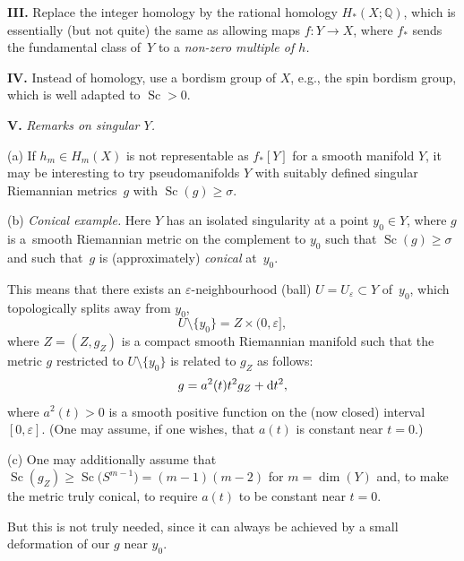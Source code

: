 \documentclass[10pt,a4paper]{amsart}
\numberwithin{equation}{section}
\begin{document}
\textbf{III.} Replace the integer homology by the rational homology $H_\ast(X;\mathbb Q)$, which is essentially (but not quite)
the same as allowing maps $f\colon Y\to X$, where
$f_\ast$ sends
 the fundamental class of~$Y$ to a {\it non-zero multiple of $h$.}

\textbf{IV.} Instead of homology, use a bordism group of $X$, e.g., the spin bordism group, which is well adapted to $\operatorname{Sc}>0$.

\textbf{V.} {\it Remarks on singular $Y$.}

(a) If $h_m\in H_m(X)$ is not representable as $f_\ast[Y]$ for a smooth manifold $Y$, it may be interesting to try pseudomanifolds $Y$ with suitably defined singular Riemannian metrics~$g$  with ${\operatorname{Sc}(g)\geq \sigma}$.

(b) {\it Conical example.} Here $Y$ has an isolated singularity at a point $y_0\in Y$, where $g$ is a~smooth Riemannian metric on the complement to $y_0$ such that $\operatorname{Sc}(g)\geq \sigma$ and such that~$g $ is (approximately) {\it conical} at~$y_0$.

This means that there exists an $\varepsilon$-neighbourhood (ball) $U=U_\varepsilon\subset Y$ of~$y_0$, which topologically splits away from $y_0$,
\[
U\setminus \{y_0\}=Z\times (0,\varepsilon],
\]
 where $Z=(Z,g_Z)$ is a compact smooth Riemannian manifold such that the metric $g$ restricted to
 $U\setminus \{y_0\}$ is related to $g_Z$ as follows:
\[
g= a^2(t)t^2g_Z +{\rm d}t^2,
\]
where $a^2(t)>0$ is a smooth positive function on the (now closed) interval $[0, \varepsilon]$. (One may assume, if one wishes, that $a(t)$ is constant near $ t=0$.)

(c) One may additionally assume that $\operatorname{Sc}(g_Z)\geq \operatorname{Sc}\bigl(S^{m-1}\bigr)=(m-1)(m-2)$ for $m=\dim(Y)$ and, to make the metric truly conical, to require $a(t)$ to be constant near $ t=0$.

But this is not truly needed, since it can always be achieved by a small deformation of our $g$ near $y_0$.
\end{document}
